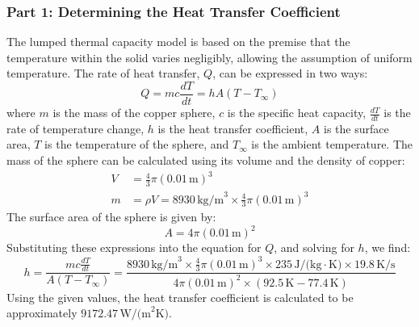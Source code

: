 \documentclass{article}
\numberwithin{equation}{section}
\begin{document}
\subsubsection*{Part 1: Determining the Heat Transfer Coefficient}
The lumped thermal capacity model is based on the premise that the temperature within the solid varies negligibly, allowing the assumption of uniform temperature. The rate of heat transfer, $Q$, can be expressed in two ways:
\begin{equation}
    Q = mc\frac{dT}{dt} = hA(T - T_{\infty})
\end{equation}
where $m$ is the mass of the copper sphere, $c$ is the specific heat capacity, $\frac{dT}{dt}$ is the rate of temperature change, $h$ is the heat transfer coefficient, $A$ is the surface area, $T$ is the temperature of the sphere, and $T_{\infty}$ is the ambient temperature.
\newline\newline
The mass of the sphere can be calculated using its volume and the density of copper:
\begin{align}
    V &= \frac{4}{3}\pi (0.01 \, \text{m})^3 \\
    m &= \rho V = 8930 \, \text{kg/m}^3 \times \frac{4}{3}\pi (0.01 \, \text{m})^3
\end{align}
\noindent
The surface area of the sphere is given by:
\begin{equation}
    A = 4\pi (0.01 \, \text{m})^2
\end{equation}
\noindent
Substituting these expressions into the equation for $Q$, and solving for $h$, we find:
\begin{equation}
    h = \frac{mc\frac{dT}{dt}}{A(T - T_{\infty})} = \frac{8930 \, \text{kg/m}^3 \times \frac{4}{3}\pi (0.01 \, \text{m})^3 \times 235 \, \text{J/(kg} \cdot \text{K)} \times 19.8 \, \text{K/s}}{4\pi (0.01 \, \text{m})^2 \times (92.5 \, \text{K} - 77.4 \, \text{K})}
\end{equation}
\noindent
Using the given values, the heat transfer coefficient is calculated to be approximately $9172.47 \, \text{W/(m}^2\text{K)}$.
\end{document}
